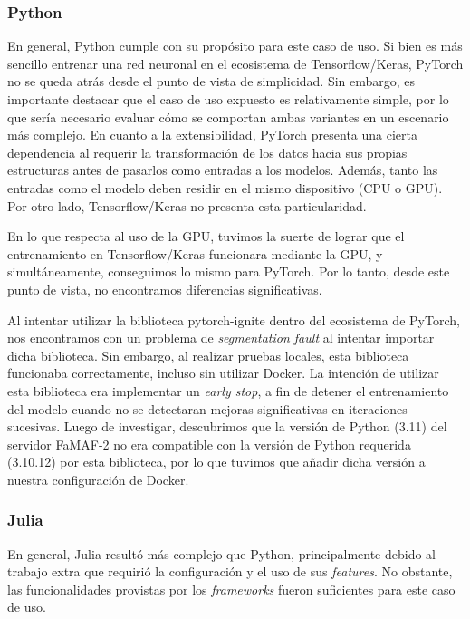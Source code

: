 \documentclass[11pt]{article}
\let\Oldsubsubsection\subsubsection
\renewcommand{\subsubsection}{\FloatBarrier\Oldsubsubsection}
\newcommand{\english}[1]{\textit{#1}}
\begin{document}
\subsubsection{Python}

En general, Python cumple con su propósito para este caso de uso. Si bien es más sencillo entrenar una red neuronal en el ecosistema de Tensorflow/Keras, PyTorch no se queda atrás desde el punto de vista de simplicidad. Sin embargo, es importante destacar que el caso de uso expuesto es relativamente simple, por lo que sería necesario evaluar cómo se comportan ambas variantes en un escenario más complejo. En cuanto a la extensibilidad, PyTorch presenta una cierta dependencia al requerir la transformación de los datos hacia sus propias estructuras antes de pasarlos como entradas a los modelos. Además, tanto las entradas como el modelo deben residir en el mismo dispositivo (CPU o GPU). Por otro lado, Tensorflow/Keras no presenta esta particularidad.

En lo que respecta al uso de la GPU, tuvimos la suerte de lograr que el entrenamiento en Tensorflow/Keras funcionara mediante la GPU, y simultáneamente, conseguimos lo mismo para PyTorch. Por lo tanto, desde este punto de vista, no encontramos diferencias significativas.

Al intentar utilizar la biblioteca pytorch-ignite dentro del ecosistema de PyTorch, nos encontramos con un problema de \english{segmentation fault} al intentar importar dicha biblioteca. Sin embargo, al realizar pruebas locales, esta biblioteca funcionaba correctamente, incluso sin utilizar Docker. La intención de utilizar esta biblioteca era implementar un \english{early stop}, a fin de detener el entrenamiento del modelo cuando no se detectaran mejoras significativas en iteraciones sucesivas. Luego de investigar, descubrimos que la versión de Python (3.11) del servidor FaMAF-2 no era compatible con la versión de Python requerida (3.10.12) por esta biblioteca, por lo que tuvimos que añadir dicha versión a nuestra configuración de Docker.

\subsubsection{Julia}

En general, Julia resultó más complejo que Python, principalmente debido al trabajo extra que requirió la configuración y el uso de sus \english{features}. No obstante, las funcionalidades provistas por los \english{frameworks} fueron suficientes para este caso de uso.
\end{document}
